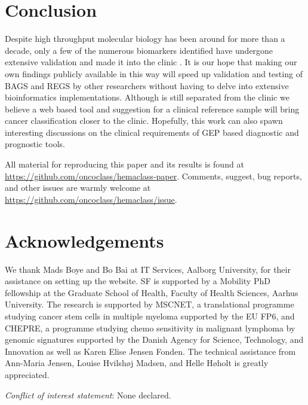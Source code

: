 \documentclass{article}
\begin{document}
\section{Conclusion}
Despite high throughput molecular biology has been around for more than a decade, only a few of the numerous biomarkers identified have undergone extensive validation and made it into the clinic \citep{Chen2012a}.
It is our hope that making our own findings publicly available in this way will speed up validation and testing of BAGS and REGS by other researchers without having to delve into extensive bioinformatics implementations.
Although \hemaClass{} is still separated from the clinic we believe a web based tool and suggestion for a clinical reference sample will bring cancer classification closer to the clinic.
Hopefully, this work can also spawn interesting discussions on the clinical requirements of GEP based diagnostic and prognostic tools.

All material for reproducing this paper and its results is found at \url{https://github.com/oncoclass/hemaclass-paper}.
Comments, suggest, bug reports, and other issues are warmly welcome at \url{https://github.com/oncoclass/hemaclass/issue}.

{}
\section*{Acknowledgements}
We thank Mads Boye and Bo Bai at IT Services, Aalborg University, for their assistance on setting up the website.
SF is supported by a Mobility PhD fellowship at the Graduate School of Health, Faculty of Health Sciences, Aarhus University.
The research is supported by MSCNET, a translational programme studying cancer stem cells in multiple myeloma supported by the EU FP6, and CHEPRE, a programme studying chemo sensitivity in malignant lymphoma by genomic signatures supported by the Danish Agency for Science, Technology, and Innovation as well as Karen Elise Jensen Fonden.
The technical assistance from Ann-Maria Jensen, Louise Hvilsh{\o}j Madsen, and Helle H{\o}holt is greatly appreciated.



\noindent\textit{Conflict of interest statement}: None declared.
{}



\cleardoublepage

\renewcommand{\theequation}{S\arabic{equation}}
\renewcommand{\thefigure}{S\arabic{figure}}
\renewcommand{\thetable}{S\arabic{table}}
\renewcommand{\thesection}{S\arabic{section}}

\setcounter{section}{0}
\setcounter{subsection}{0}
\setcounter{equation}{0}
\setcounter{figure}{0}
\setcounter{table}{0}
\setcounter{page}{1}



\cleardoublepage
\listoftodos
\end{document}

